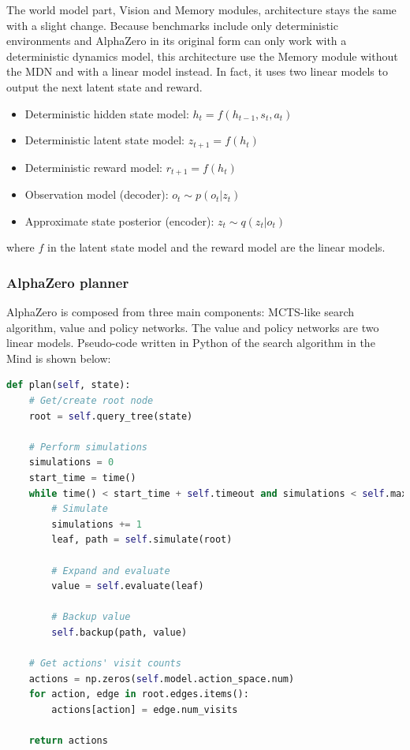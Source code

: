 The world model part, Vision and Memory modules, architecture stays the same with a slight change. Because benchmarks include only deterministic environments and AlphaZero in its original form can only work with a deterministic dynamics model, this architecture use the Memory module without the MDN and with a linear model instead. In fact, it uses two linear models to output the next latent state and reward.
\begin{itemize}
\item Deterministic hidden state model:      $h_t = f(h_{t-1}, s_{t}, a_{t})$
\item Deterministic latent state model:      $z_{t+1} = f(h_t)$
\item Deterministic reward model:            $r_{t+1} = f(h_t)$
\item Observation model (decoder):           $o_t \sim p(o_t|z_t)$
\item Approximate state posterior (encoder): $z_t \sim q(z_t|o_t)$
\end{itemize}
where $f$ in the latent state model and the reward model are the linear models.

\subsubsection{AlphaZero planner}


AlphaZero is composed from three main components: MCTS-like search algorithm, value and policy networks. The value and policy networks are two linear models. 
Pseudo-code written in Python of the search algorithm in the Mind is shown below:

\noindent\begin{minipage}{\textwidth} %
\begin{lstlisting}[language=Python]
def plan(self, state):
    # Get/create root node
    root = self.query_tree(state)

    # Perform simulations
    simulations = 0
    start_time = time()
    while time() < start_time + self.timeout and simulations < self.max_simulations:
        # Simulate
        simulations += 1
        leaf, path = self.simulate(root)

        # Expand and evaluate
        value = self.evaluate(leaf)

        # Backup value
        self.backup(path, value)

    # Get actions' visit counts
    actions = np.zeros(self.model.action_space.num)
    for action, edge in root.edges.items():
        actions[action] = edge.num_visits

    return actions
\end{lstlisting}
\end{minipage}

